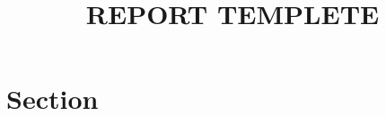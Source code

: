 \documentclass[titlepage]{article}
\title{REPORT TEMPLETE}
\begin{document}
\maketitle
\section{Section}
    \lipsum[1]


\end{document}
